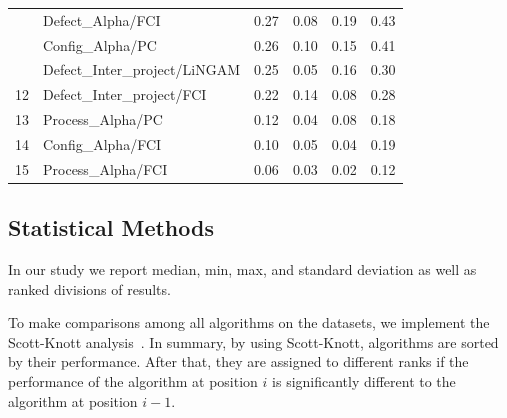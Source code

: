 \documentclass[]{svjour3}
\begin{document}
\begin{table}[]
\begin{tabular}{|l|l|l|l|l|l|}
   & Defect\_Alpha/FCI             & 0.27   & 0.08  & 0.19   & 0.43    \\ 
   & Config\_Alpha/PC              & 0.26   & 0.10  & 0.15   & 0.41    \\ 
   & Defect\_Inter\_project/LiNGAM & 0.25   & 0.05  & 0.16   & 0.30    \\ \hline
12   & Defect\_Inter\_project/FCI    & 0.22   & 0.14  & 0.08   & 0.28    \\ \hline
13   & Process\_Alpha/PC             & 0.12   & 0.04  & 0.08   & 0.18    \\ \hline
14   & Config\_Alpha/FCI             & 0.10   & 0.05  & 0.04   & 0.19    \\ \hline
15   & Process\_Alpha/FCI            & 0.06   & 0.03  & 0.02   & 0.12    \\ \hline
\end{tabular}
\end{table}

\subsection{Statistical Methods}\label{stats}

In our study we report median, min, max, and standard deviation as well as ranked divisions of results.

To make comparisons among all algorithms on  the datasets, we implement the Scott-Knott analysis~\cite{mittas2012ranking}. In summary,
by using Scott-Knott, algorithms are sorted by their performance.
After that, they are assigned to different ranks
if the performance of the algorithm at position $i$ is significantly
different to the algorithm at position $i-1$.
\end{document}

